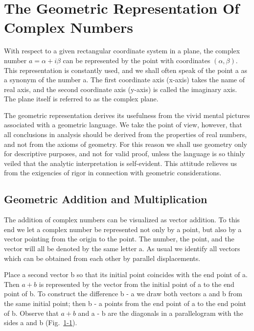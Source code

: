 \setcounter{section}{1}\section{The Geometric Representation Of Complex Numbers}\label{sec:1.2}
With respect to a given rectangular coordinate system in a plane, the complex number $a = \alpha + i\beta$ can be represented by the point with coordinates $(\alpha, \beta)$. This representation is constantly used, and we shall often speak of the point a as a synonym of the number a. The first coordinate axis (x-axis) takes the name of real axis, and the second coordinate axis (y-axis) is called the imaginary axis. The plane itself is referred to as the complex plane.

The geometric representation derives its usefulness from the vivid mental pictures associated with a geometric language. We take the point of view, however, that all conclusions in analysis should be derived from the properties of real numbers, and not from the axioms of geometry. For this reason we shall use geometry only for descriptive purposes, and not for valid proof, unless the language is so thinly veiled that the analytic interpretation is self-evident. This attitude relieves us from the exigencies of rigor in connection with geometric considerations.

\setcounter{section}{2}\setcounter{subsection}{0}\subsection{Geometric Addition and Multiplication}\label{sec:1.2.1}
The addition of complex numbers can be visualized as vector addition. To this end we let a complex number be represented not only by a point, but also by a vector pointing from the origin to the point. The number, the point, and the vector will all be denoted by the same letter a. As usual we identify all vectors which can be obtained from each other by parallel displacements.

Place a second vector b so that its initial point coincides with the end point of a. Then $a + b$ is represented by the vector from the initial point of a to the end point of b. To construct the difference b - a we draw both vectors a and b from the same initial point; then b - a points from the end point of a to the end point of b. Observe that $a + b$ and a - b are the diagonals in a parallelogram with the sides a and b (Fig.~\hyperref[fig:1-1]{1-1}).

